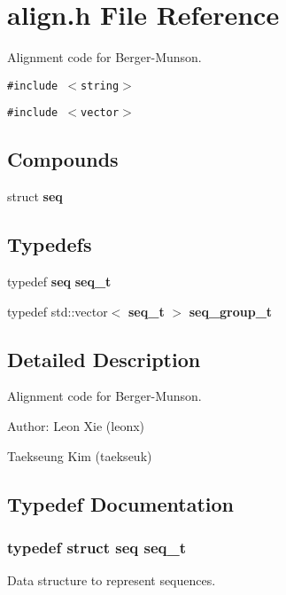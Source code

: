 \section{align.h File Reference}
\label{align_8h}
Alignment code for Berger-Munson.  


{\tt \#include $<$string$>$}\par
{\tt \#include $<$vector$>$}\par
\subsection*{Compounds}
\begin{CompactItemize}
\item 
struct {\bf seq}
\end{CompactItemize}
\subsection*{Typedefs}
\begin{CompactItemize}
\item 
typedef {\bf seq} {\bf seq\_\-t}
\item 
typedef std::vector$<$ {\bf seq\_\-t} $>$ {\bf seq\_\-group\_\-t}\label{align_8h_a1}

\end{CompactItemize}


\subsection{Detailed Description}
Alignment code for Berger-Munson. 

\begin{Desc}
\item[Author:]Leon Xie (leonx) 

Taekseung Kim (taekseuk)\end{Desc}


\subsection{Typedef Documentation}
\subsubsection{\setlength{\rightskip}{0pt plus 5cm}typedef struct {\bf seq}  {\bf seq\_\-t}}\label{align_8h_a0}


Data structure to represent sequences. 